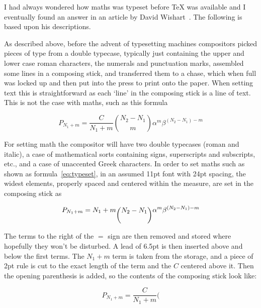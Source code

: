 \documentclass[10pt,a4paper,extrafontsizes]{memoir}
\begin{document}
\begin{paracol}{2}
\switchEng
    I had always wondered how maths was typeset before TeX was available and
I eventually found an answer in an article by David Wishart~\autocite{WISHART03}.
The following is based upon his descriptions.

    As described above, before the advent of typesetting machines compositors 
picked pieces of type from a double typecase, 
typically just containing the 
upper and lower case roman characters, the numerals and punctuation marks, 
assembled some lines in a composing stick, 
and transferred them to a chase, which when full was locked 
up and then 
put into the press to print onto the paper. When setting text this is
straightforward as each `line' in the composing stick is a line of text.
This is not the case with maths, such as this formula

\begin{equation} \label{eq:typeset}
P_{N_1 + m} = \frac{C}{N_{1} + m} \binom{N_{2} - N_{1}}{m}
              \alpha^{m}\beta^{(N_{2}-N_{1}) - m}
\end{equation}

    For setting math the compositor will have two double 
typecases (roman
and italic), a case of mathematical sorts containing signs, superscripts
and subscripts, etc., and a case of unaccented Greek characters.
    In order to set maths such as shown as formula~\ref{eq:typeset},
in an assumed 11pt font with 24pt spacing, 
the widest elements, properly spaced and centered within the measure, 
are set in the composing stick as

\begin{displaymath}
P_{N_1 + m} = N_{1} + m \raisebox{-0.6\baselineskip}{$\displaystyle\binom{N_{2} - N_{1}}{\phantom{m}}$}
              \alpha^{m}\beta^{(N_{2}-N_{1}) - m}
\end{displaymath}

    The terms to the right of the $=$ sign are then removed and stored where
hopefully they won't be disturbed. A lead of 6.5pt is then inserted above and below 
the first terms.
The $N_{1} +m$ term is taken from the storage, and a piece of 2pt rule is cut
to the exact length of the term and the $C$ centered above it. Then the opening
parenthesis is added, so the contents of the composing stick look like:

\begin{displaymath}
P_{N_1 + m} = \frac{C}{N_{1} + m} \bigg(
\end{displaymath}


\end{paracol}
\end{document}
